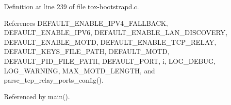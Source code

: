 Definition at line 239 of file tox-\/bootstrapd.\+c.



References D\+E\+F\+A\+U\+L\+T\+\_\+\+E\+N\+A\+B\+L\+E\+\_\+\+I\+P\+V4\+\_\+\+F\+A\+L\+L\+B\+A\+C\+K, D\+E\+F\+A\+U\+L\+T\+\_\+\+E\+N\+A\+B\+L\+E\+\_\+\+I\+P\+V6, D\+E\+F\+A\+U\+L\+T\+\_\+\+E\+N\+A\+B\+L\+E\+\_\+\+L\+A\+N\+\_\+\+D\+I\+S\+C\+O\+V\+E\+R\+Y, D\+E\+F\+A\+U\+L\+T\+\_\+\+E\+N\+A\+B\+L\+E\+\_\+\+M\+O\+T\+D, D\+E\+F\+A\+U\+L\+T\+\_\+\+E\+N\+A\+B\+L\+E\+\_\+\+T\+C\+P\+\_\+\+R\+E\+L\+A\+Y, D\+E\+F\+A\+U\+L\+T\+\_\+\+K\+E\+Y\+S\+\_\+\+F\+I\+L\+E\+\_\+\+P\+A\+T\+H, D\+E\+F\+A\+U\+L\+T\+\_\+\+M\+O\+T\+D, D\+E\+F\+A\+U\+L\+T\+\_\+\+P\+I\+D\+\_\+\+F\+I\+L\+E\+\_\+\+P\+A\+T\+H, D\+E\+F\+A\+U\+L\+T\+\_\+\+P\+O\+R\+T, i, L\+O\+G\+\_\+\+D\+E\+B\+U\+G, L\+O\+G\+\_\+\+W\+A\+R\+N\+I\+N\+G, M\+A\+X\+\_\+\+M\+O\+T\+D\+\_\+\+L\+E\+N\+G\+T\+H, and parse\+\_\+tcp\+\_\+relay\+\_\+ports\+\_\+config().



Referenced by main().


